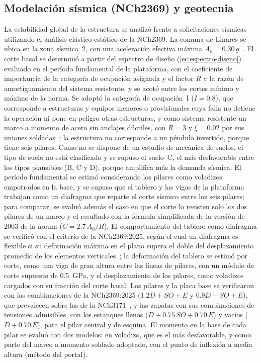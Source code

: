 \subsection{Modelación sísmica (NCh2369) y geotecnia}

La estabilidad global de la estructura se analizó frente a solicitaciones sísmicas utilizando el análisis elástico estático de la NCh2369.
La comuna de Linares se ubica en la zona sísmica~2, con una aceleración efectiva máxima $A_0 = \num{0.30}\,g$~\parencite{inn2025nch2369}.
El corte basal se determinó a partir del espectro de diseño (\cref{ec:espectro-diseno}) evaluado en el período fundamental de la plataforma, con el coeficiente de importancia de la categoría de ocupación asignada y el factor $R$ y la razón de amortiguamiento del sistema resistente, y se acotó entre los cortes mínimo y máximo de la norma.
Se adoptó la categoría de ocupación~I ($I = \num{0.8}$), que corresponde a estructuras y equipos menores o provisionales cuya falla no detiene la operación ni pone en peligro otras estructuras, y como sistema resistente un marco a momento de acero sin anclajes dúctiles, con $R = 3$ y $\xi = \num{0.02}$ por sus uniones soldadas~\parencite{inn2025nch2369}; la estructura no corresponde a un péndulo invertido, porque tiene seis pilares.
Como no se dispone de un estudio de mecánica de suelos, el tipo de suelo no está clasificado y se supuso el suelo~C, el más desfavorable entre los tipos plausibles (B, C y D), porque amplifica más la demanda sísmica.
El período fundamental se estimó considerando los pilares como voladizos empotrados en la base, y se supuso que el tablero y las vigas de la plataforma trabajan como un diafragma que reparte el corte sísmico entre los seis pilares; para comparar, se evaluó además el caso en que el corte lo resisten solo los dos pilares de un marco y el resultado con la fórmula simplificada de la versión de 2003 de la norma ($C = \num{2.7}\,A_0/R$).
El comportamiento del tablero como diafragma se verificó con el criterio de la NCh2369:2025, según el cual un diafragma es flexible si su deformación máxima en el plano supera el doble del desplazamiento promedio de los elementos verticales~\parencite{inn2025nch2369}; la deformación del tablero se estimó por corte, como una viga de gran altura entre las líneas de pilares, con un módulo de corte supuesto de \qty{0.5}{\giga\pascal}, y el desplazamiento de los pilares, como voladizos cargados con su fracción del corte basal.
Los pilares y la placa base se verificaron con las combinaciones de la NCh2369:2025 ($\num{1.2}D + SO + E$ y $\num{0.9}D + SO + E$), que prevalecen sobre las de la NCh3171~\parencite{inn2017nch3171}, y las zapatas con sus combinaciones de tensiones admisibles, con los estanques llenos ($D + \num{0.75}\,SO + \num{0.70}\,E$) y vacíos ($D + \num{0.70}\,E$), para el pilar central y de esquina.
El momento en la base de cada pilar se evaluó con dos modelos: en voladizo, que es el más desfavorable, y como parte del marco a momento soldado adoptado, con el punto de inflexión a media altura (método del portal).

